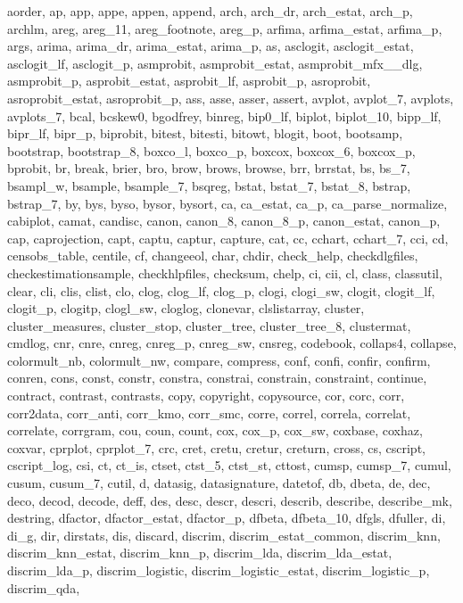 {{    aorder, ap, app, appe, appen, append, arch, arch_dr, arch_estat, arch_p, archlm, areg, areg_11, areg_footnote, areg_p, arfima, arfima_estat, arfima_p, args, arima, arima_dr, arima_estat, arima_p, as, asclogit,
    asclogit_estat, asclogit_lf, asclogit_p, asmprobit, asmprobit_estat, asmprobit_mfx__dlg, asmprobit_p, asprobit_estat, asprobit_lf, asprobit_p, asroprobit, asroprobit_estat, asroprobit_p, ass, asse, asser, assert,
    avplot, avplot_7, avplots, avplots_7, bcal, bcskew0, bgodfrey, binreg, bip0_lf, biplot, biplot_10, bipp_lf, bipr_lf, bipr_p, biprobit, bitest, bitesti, bitowt, blogit, boot, bootsamp, bootstrap, bootstrap_8, boxco_l,
    boxco_p, boxcox, boxcox_6, boxcox_p, bprobit, br, break, brier, bro, brow, brows, browse, brr, brrstat, bs, bs_7, bsampl_w, bsample, bsample_7, bsqreg, bstat, bstat_7, bstat_8, bstrap, bstrap_7, by, bys, byso, bysor,
    bysort, ca, ca_estat, ca_p, ca_parse_normalize, cabiplot, camat, candisc, canon, canon_8, canon_8_p, canon_estat, canon_p, cap, caprojection, capt, captu, captur, capture, cat, cc, cchart, cchart_7, cci, cd,
    censobs_table, centile, cf, changeeol, char, chdir, check_help, checkdlgfiles, checkestimationsample, checkhlpfiles, checksum, chelp, ci, cii, cl, class, classutil, clear, cli, clis, clist, clo, clog, clog_lf, clog_p,
    clogi, clogi_sw, clogit, clogit_lf, clogit_p, clogitp, clogl_sw, cloglog, clonevar, clslistarray, cluster, cluster_measures, cluster_stop, cluster_tree, cluster_tree_8, clustermat, cmdlog, cnr, cnre, cnreg, cnreg_p,
    cnreg_sw, cnsreg, codebook, collaps4, collapse, colormult_nb, colormult_nw, compare, compress, conf, confi, confir, confirm, conren, cons, const, constr, constra, constrai, constrain, constraint, continue, contract,
    contrast, contrasts, copy, copyright, copysource, cor, corc, corr, corr2data, corr_anti, corr_kmo, corr_smc, corre, correl, correla, correlat, correlate, corrgram, cou, coun, count, cox, cox_p, cox_sw, coxbase, coxhaz,
    coxvar, cprplot, cprplot_7, crc, cret, cretu, cretur, creturn, cross, cs, cscript, cscript_log, csi, ct, ct_is, ctset, ctst_5, ctst_st, cttost, cumsp, cumsp_7, cumul, cusum, cusum_7, cutil, d, datasig, datasignature,
    datetof, db, dbeta, de, dec, deco, decod, decode, deff, des, desc, descr, descri, describ, describe, describe_mk, destring, dfactor, dfactor_estat, dfactor_p, dfbeta, dfbeta_10, dfgls, dfuller, di, di_g, dir, dirstats,
    dis, discard, discrim, discrim_estat_common, discrim_knn, discrim_knn_estat, discrim_knn_p, discrim_lda, discrim_lda_estat, discrim_lda_p, discrim_logistic, discrim_logistic_estat, discrim_logistic_p, discrim_qda,
}}
